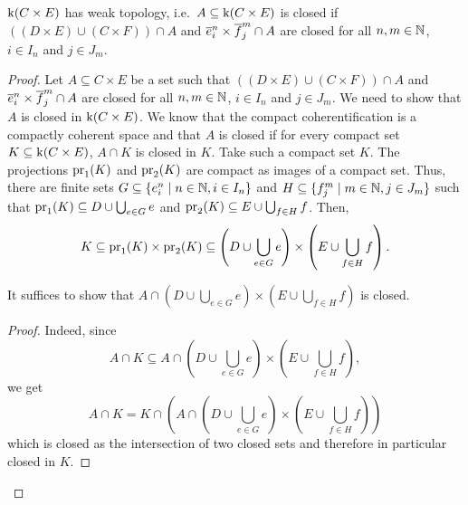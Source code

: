 \begin{lem}\label{lem:weaktopologyproduct}
    $\kif (C \times E)$ has weak topology,
    i.e.\ $A \subseteq \kif (C \times E)$ is closed if $((D \times E) \cup (C \times F)) \cap A$ and $\closedCell{n}{i} \times \closedCellf{m}{j} \cap A$ are closed for all $n, m \in \bN$, $i \in I_n$ and $j \in J_m$. 
\end{lem}
\begin{proof}
  Let $A \subseteq C \times E$ be a set such that $((D \times E) \cup (C \times F)) \cap A$ and $\closedCell{n}{i} \times \closedCellf{m}{j} \cap A$ are closed for all $n, m \in \bN$, $i \in I_n$ and $j \in J_m$. 
  We need to show that $A$ is closed in $\kif (C \times E)$.
  We know that the compact coherentification is a compactly coherent space and that $A$ is closed if for every compact set $K \subseteq \kif (C \times E)$, $A \cap K$ is closed in $K$.
    Take such a compact set $K$.
    The projections $\pr{1}{K}$ and $\pr{2}{K}$ are compact as images of a compact set. 
    Thus, there are finite sets $G \subseteq \{e_i^n \mid n \in \bN, i \in I_n \}$ and $H \subseteq \{f_j^m \mid m \in \bN, j \in J_m \}$ such that $\pr{1}{K} \subseteq D \cup \bigcup_{e \in G} e$ and $\pr{2}{K} \subseteq E \cup \bigcup_{f \in H} f$.
    Then,
    \begin{equation*}
      K \subseteq \pr{1}{K} \times \pr{2}{K} \subseteq \left( D \cup \bigcup_{e \in G} e \right) \times \left( E \cup \bigcup_{f \in H} f\right).
    \end{equation*}
    \begin{claim}
      It suffices to show that $A \cap \left( D \cup \bigcup_{e \in G} e \right) \times \left( E \cup \bigcup_{f \in H} f\right)$ is closed.
      \begin{proof}
        Indeed, since 
        \begin{equation*}
          A \cap K \subseteq A \cap \left( D \cup \bigcup_{e \in G} e \right) \times \left( E \cup \bigcup_{f \in H} f\right),
        \end{equation*}
        we get
        \begin{equation*}
          A \cap K = K \cap \left(A \cap \left( D \cup \bigcup_{e \in G} e \right) \times \left( E \cup \bigcup_{f \in H} f\right) \right)
        \end{equation*}
        which is closed as the intersection of two closed sets and therefore in particular closed in $K$. 
      \end{proof} 

\end{claim}
\end{proof}
